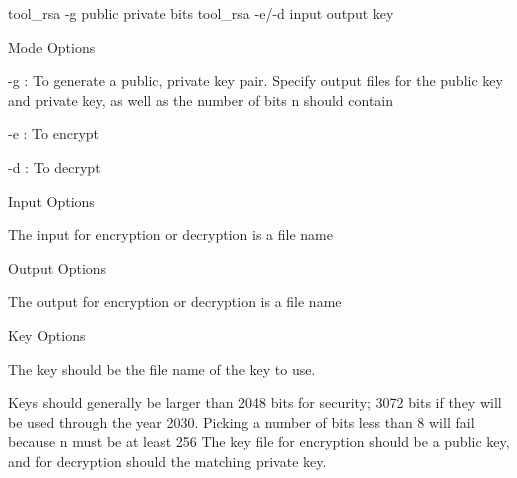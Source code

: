 \begin{DoxyVerb}tool_rsa -g public private bits
tool_rsa -e/-d input output key
\end{DoxyVerb}
 Mode Options
\begin{DoxyItemize}
\item -\/g \+: To generate a public, private key pair. Specify output files for the public key and private key, as well as the number of bits n should contain
\item -\/e \+: To encrypt
\item -\/d \+: To decrypt
\end{DoxyItemize}

Input Options
\begin{DoxyItemize}
\item The input for encryption or decryption is a file name
\end{DoxyItemize}

Output Options
\begin{DoxyItemize}
\item The output for encryption or decryption is a file name
\end{DoxyItemize}

Key Options
\begin{DoxyItemize}
\item The key should be the file name of the key to use.
\end{DoxyItemize}

Keys should generally be larger than 2048 bits for security; 3072 bits if they will be used through the year 2030. Picking a number of bits less than 8 will fail because n must be at least 256 The key file for encryption should be a public key, and for decryption should the matching private key. 